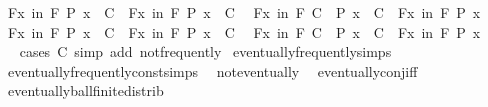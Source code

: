 \begin{isabellebody}
\ \ {\isachardoublequoteopen}{\isacharparenleft}{\kern0pt}{\isasymforall}\isactrlsub Fx\ in\ F{\isachardot}{\kern0pt}\ P\ x\ {\isasymor}\ C{\isacharparenright}{\kern0pt}\ {\isasymlongleftrightarrow}\ {\isacharparenleft}{\kern0pt}{\isasymforall}\isactrlsub Fx\ in\ F{\isachardot}{\kern0pt}\ P\ x{\isacharparenright}{\kern0pt}\ {\isasymor}\ C{\isachardoublequoteclose}\isanewline
\ \ {\isachardoublequoteopen}{\isacharparenleft}{\kern0pt}{\isasymforall}\isactrlsub Fx\ in\ F{\isachardot}{\kern0pt}\ C\ {\isasymor}\ P\ x{\isacharparenright}{\kern0pt}\ {\isasymlongleftrightarrow}\ C\ {\isasymor}\ {\isacharparenleft}{\kern0pt}{\isasymforall}\isactrlsub Fx\ in\ F{\isachardot}{\kern0pt}\ P\ x{\isacharparenright}{\kern0pt}{\isachardoublequoteclose}\isanewline
\ \ {\isachardoublequoteopen}{\isacharparenleft}{\kern0pt}{\isasymforall}\isactrlsub Fx\ in\ F{\isachardot}{\kern0pt}\ P\ x\ {\isasymlongrightarrow}\ C{\isacharparenright}{\kern0pt}\ {\isasymlongleftrightarrow}\ {\isacharparenleft}{\kern0pt}{\isacharparenleft}{\kern0pt}{\isasymexists}\isactrlsub Fx\ in\ F{\isachardot}{\kern0pt}\ P\ x{\isacharparenright}{\kern0pt}\ {\isasymlongrightarrow}\ C{\isacharparenright}{\kern0pt}{\isachardoublequoteclose}\isanewline
\ \ {\isachardoublequoteopen}{\isacharparenleft}{\kern0pt}{\isasymforall}\isactrlsub Fx\ in\ F{\isachardot}{\kern0pt}\ C\ {\isasymlongrightarrow}\ P\ x{\isacharparenright}{\kern0pt}\ {\isasymlongleftrightarrow}\ {\isacharparenleft}{\kern0pt}C\ {\isasymlongrightarrow}\ {\isacharparenleft}{\kern0pt}{\isasymforall}\isactrlsub Fx\ in\ F{\isachardot}{\kern0pt}\ P\ x{\isacharparenright}{\kern0pt}{\isacharparenright}{\kern0pt}{\isachardoublequoteclose}\isanewline
%
\isadelimproof
\ \ %
\endisadelimproof
%
\isatagproof
{}\isamarkupfalse%
\ {\isacharparenleft}{\kern0pt}cases\ C{\isacharsemicolon}{\kern0pt}\ simp\ add{\isacharcolon}{\kern0pt}\ not{\isacharunderscore}{\kern0pt}frequently{\isacharparenright}{\kern0pt}{\isacharplus}{\kern0pt}%
\endisatagproof
{\isafoldproof}%
%
\isadelimproof
\isanewline
%
\endisadelimproof
\isanewline
{}\isamarkupfalse%
\ eventually{\isacharunderscore}{\kern0pt}frequently{\isacharunderscore}{\kern0pt}simps\ {\isacharequal}{\kern0pt}\isanewline
\ \ eventually{\isacharunderscore}{\kern0pt}frequently{\isacharunderscore}{\kern0pt}const{\isacharunderscore}{\kern0pt}simps\isanewline
\ \ not{\isacharunderscore}{\kern0pt}eventually\isanewline
\ \ eventually{\isacharunderscore}{\kern0pt}conj{\isacharunderscore}{\kern0pt}iff\isanewline
\ \ eventually{\isacharunderscore}{\kern0pt}ball{\isacharunderscore}{\kern0pt}finite{\isacharunderscore}{\kern0pt}distrib\isanewline

\end{isabellebody}
